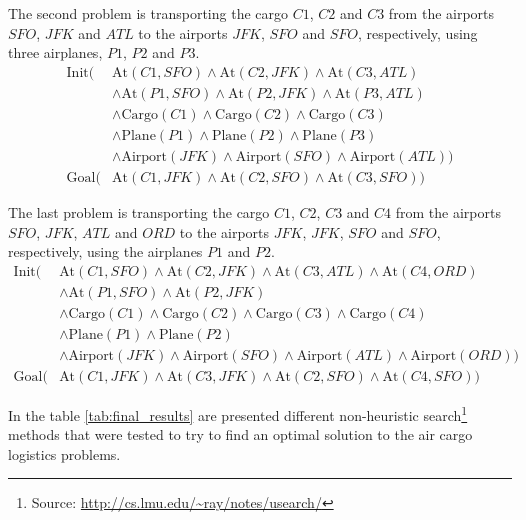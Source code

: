 \documentclass[a4paper]{article}
\begin{document}
The second problem is transporting the cargo $C1$, $C2$ and $C3$ from the airports $SFO$, $JFK$ and $ATL$ to the airports $JFK$, $SFO$ and $SFO$, respectively, using three airplanes, $P1$, $P2$ and $P3$.
\begin{equation*}
  \begin{aligned}
    \mbox{Init}(&\mbox{At}(C1, SFO) \wedge \mbox{At}(C2, JFK) \wedge \mbox{At}(C3, ATL) \\
         &\wedge \mbox{At}(P1, SFO) \wedge \mbox{At}(P2, JFK) \wedge \mbox{At}(P3, ATL)\\
         &\wedge \mbox{Cargo}(C1) \wedge \mbox{Cargo}(C2) \wedge \mbox{Cargo}(C3)\\
         &\wedge \mbox{Plane}(P1) \wedge \mbox{Plane}(P2) \wedge \mbox{Plane}(P3)\\
         &\wedge \mbox{Airport}(JFK) \wedge \mbox{Airport}(SFO) \wedge \mbox{Airport}(ATL))\\
    \mbox{Goal}(&\mbox{At}(C1, JFK) \wedge \mbox{At}(C2, SFO) \wedge \mbox{At}(C3, SFO))
  \end{aligned}
\end{equation*}

The last problem is transporting the cargo $C1$, $C2$, $C3$ and $C4$ from the airports $SFO$, $JFK$, $ATL$ and $ORD$ to the airports $JFK$, $JFK$, $SFO$ and $SFO$, respectively, using the airplanes $P1$ and $P2$.
\begin{equation*}
  \begin{aligned}
    \mbox{Init}(&\mbox{At}(C1, SFO) \wedge \mbox{At}(C2, JFK) \wedge \mbox{At}(C3, ATL) \wedge \mbox{At}(C4, ORD) \\
         &\wedge \mbox{At}(P1, SFO) \wedge \mbox{At}(P2, JFK)\\
         &\wedge \mbox{Cargo}(C1) \wedge \mbox{Cargo}(C2) \wedge \mbox{Cargo}(C3)  \wedge \mbox{Cargo}(C4)\\
         &\wedge \mbox{Plane}(P1) \wedge \mbox{Plane}(P2) \\
         &\wedge \mbox{Airport}(JFK) \wedge \mbox{Airport}(SFO) \wedge \mbox{Airport}(ATL) \wedge \mbox{Airport}(ORD))\\
    \mbox{Goal}(&\mbox{At}(C1, JFK) \wedge \mbox{At}(C3, JFK) \wedge \mbox{At}(C2, SFO) \wedge \mbox{At}(C4, SFO))
  \end{aligned}
\end{equation*}


In the table \ref{tab:final_results} are presented different non-heuristic search\footnote{Source: \url{http://cs.lmu.edu/~ray/notes/usearch/}} methods that were tested to try to find an optimal solution to the air cargo logistics problems.
\end{document}
